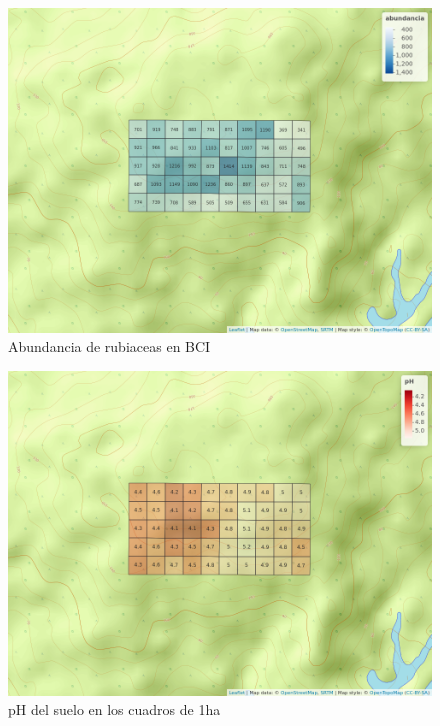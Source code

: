 \documentclass[11pt,]{article}
\begin{document}
\begin{figure}
\centering
\includegraphics{mapa_cuadros_abun_rubic.png}
\caption{Abundancia de rubiaceas en BCI
\label{fig:mapa_cuadros_abun_rubic}}
\end{figure}

\begin{figure}
\centering
\includegraphics{mapa_cuadros_ph.png}
\caption{pH del suelo en los cuadros de 1ha \label{fig:mapa_cuadros_ph}}
\end{figure}
\end{document}
